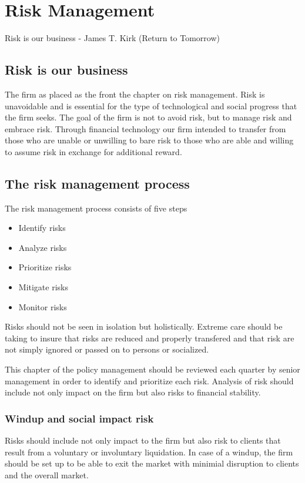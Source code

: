 \chapter{Risk Management}

Risk is our business - James T. Kirk (Return to Tomorrow)

\section{Risk is our business}
The firm as placed as the front the chapter on risk management.  Risk
is unavoidable and is essential for the type of technological and
social progress that the firm seeks.  The goal of the firm is not to
avoid risk, but to manage risk and embrace risk.  Through financial
technology our firm intended to transfer from those who are unable or
unwilling to bare risk to those who are able and willing to assume
risk in exchange for additional reward.

\section{The risk management process}

The risk management process consists of five steps
\begin{itemize}
\item Identify risks
\item Analyze risks
\item Prioritize risks
\item Mitigate risks
\item Monitor risks
\end{itemize}

Risks should not be seen in isolation but holistically.  Extreme care
should be taking to insure that risks are reduced and properly
transfered and that risk are not simply ignored or passed on to
persons or socialized.

This chapter of the policy management should be reviewed each quarter
by senior management in order to identify and prioritize each risk.
Analysis of risk should include not only impact on the firm but also
risks to financial stability.

\subsection{Windup and social impact risk}
Risks should include not only impact to the firm but also risk to
clients that result from a voluntary or involuntary liquidation.  In
case of a windup, the firm should be set up to be able to exit the
market with minimial disruption to clients and the overall market.

